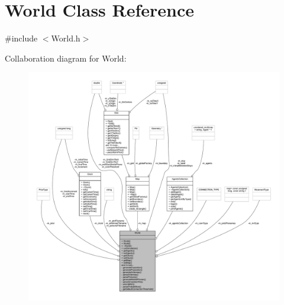 \hypertarget{class_world}{}\section{World Class Reference}
\label{class_world}


{\ttfamily \#include $<$World.\+h$>$}



Collaboration diagram for World\+:\nopagebreak
\begin{figure}[H]
\begin{center}
\leavevmode
\includegraphics[width=350pt]{class_world__coll__graph}
\end{center}
\end{figure}
